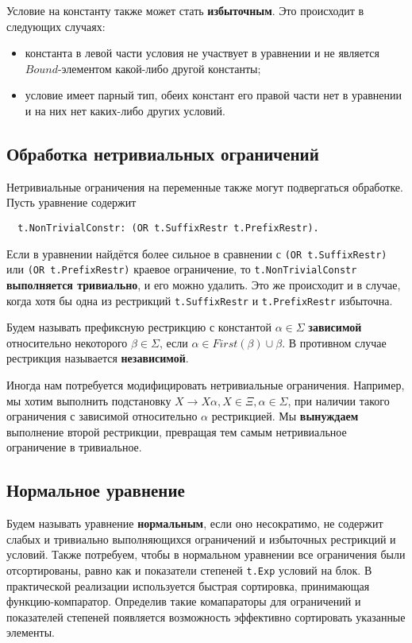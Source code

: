 \documentclass[12pt]{article}
\begin{document}
Условие на константу также может стать \textbf{избыточным}. Это происходит в
следующих случаях:
\begin{itemize}
  \item константа в левой части условия не участвует в уравнении и не является
  $Bound$-элементом какой-либо другой константы;
  \item условие имеет парный тип, обеих констант его правой части нет в
  уравнении и на них нет каких-либо других условий.
\end{itemize}

\subsection{Обработка нетривиальных ограничений}

Нетривиальные ограничения на переменные также могут подвергаться обработке.
Пусть уравнение содержит
\begin{Verbatim}
  t.NonTrivialConstr: (OR t.SuffixRestr t.PrefixRestr).
\end{Verbatim}
Если в уравнении найдётся более сильное в сравнении с
\texttt{(OR t.SuffixRestr)} или \texttt{(OR t.PrefixRestr)} краевое ограничение,
то \texttt{t.NonTrivialConstr} \textbf{выполняется тривиально}, и его можно
удалить. Это же происходит и в случае, когда хотя бы одна из рестрикций
\texttt{t.SuffixRestr} и \texttt{t.PrefixRestr} избыточна.

Будем называть префиксную рестрикцию с константой $\alpha \in \Sigma$
\textbf{зависимой} относительно некоторого $\beta \in \Sigma$, если
$\alpha \in First(\beta) \cup \beta$. В противном случае рестрикция называется
\textbf{независимой}.

Иногда нам потребуется модифицировать нетривиальные ограничения. Например, мы
хотим выполнить подстановку $X \to X \alpha, X \in \Xi, \alpha \in \Sigma$, при
наличии такого ограничения с зависимой относительно $\alpha$ рестрикцией. Мы
\textbf{вынуждаем} выполнение второй рестрикции, превращая тем самым
нетривиальное ограничение в тривиальное.

\subsection{Нормальное уравнение}

Будем называть уравнение \textbf{нормальным}, если оно несократимо, не содержит
слабых и тривиально выполняющихся ограничений и избыточных рестрикций и условий.
Также потребуем, чтобы в нормальном уравнении все ограничения были
отсортированы, равно как и показатели степеней \texttt{t.Exp} условий на блок.
В практической реализации используется быстрая сортировка, принимающая
функцию-компаратор. Определив такие комапараторы для ограничений и показателей
степеней появляется возможность эффективно сортировать указанные элементы.
\end{document}
